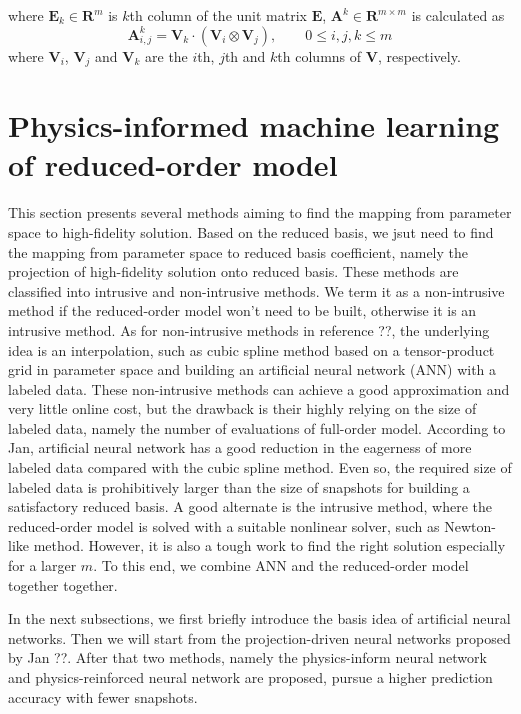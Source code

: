 \documentclass[preprint, 10pt]{elsarticle}
\begin{document}
where $\mathbf{E}_k \in \mathbf{R}^{m}$ is $k$th column of the unit matrix $\mathbf{E}$, $\mathbf{A}^k \in \mathbf{R}^{m \times m}$ is calculated as
\begin{equation}
\mathbf{A}_{i,j}^k = \mathbf{V}_k \cdot \left( \mathbf{V}_i \otimes \mathbf{V}_j \right), \qquad 0 \le i,j,k \le m
\end{equation}
where $\mathbf{V}_i$, $\mathbf{V}_j$ and $\mathbf{V}_k$ are the $i$th, $j$th and $k$th columns of $\mathbf{V}$, respectively.

\section{Physics-informed machine learning of reduced-order model}
This section presents several methods aiming to find the mapping from parameter space to high-fidelity solution. Based on the reduced basis, we jsut need to find the mapping from parameter space to reduced basis coefficient, namely the projection of high-fidelity solution onto reduced basis.
These methods are classified into intrusive and non-intrusive methods. We term it as a non-intrusive method if the reduced-order model won't need to be built, otherwise it is an intrusive method. As for non-intrusive methods in reference ??, the underlying idea is an interpolation, such as cubic spline method based on a tensor-product grid in parameter space and building an artificial neural network (ANN) with a labeled data. These non-intrusive methods can achieve a good approximation and very little online cost, but the drawback is their highly relying on the size of labeled data, namely the number of evaluations of full-order model. According to Jan, artificial neural network has a good reduction in the eagerness of more labeled data compared with the cubic spline method. Even so, the required size of labeled data is prohibitively larger than the size of snapshots for building a satisfactory reduced basis. A good alternate is the intrusive method, where the reduced-order model is solved with a suitable nonlinear solver, such as Newton-like method. However, it is also a tough work to find the right solution especially for a larger $m$. To this end, we combine ANN and the reduced-order model together together.

In the next subsections, we first briefly introduce the basis idea of artificial neural networks. Then we will start from the projection-driven neural networks proposed by Jan ??. After that two methods, namely the physics-inform neural network and physics-reinforced neural network are proposed, pursue a higher prediction accuracy with fewer snapshots.
\end{document}
